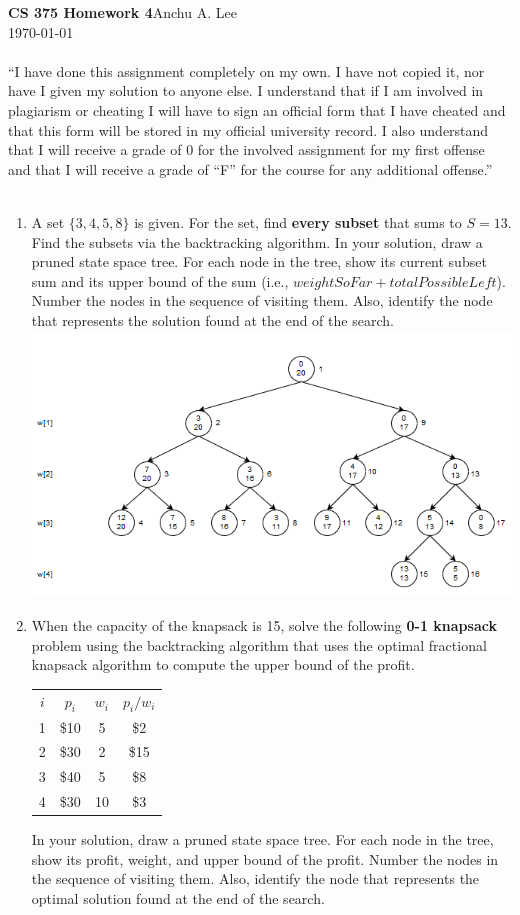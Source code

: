 \documentclass{article}
\begin{document}
\noindent\textbf{CS 375 Homework 4}\hfill Anchu A. Lee\\
\noindent\today
\\\\“I have done this assignment completely on my own. I have not copied it, nor have I given my solution to anyone else. I understand that if I am involved in plagiarism or cheating I will have to sign an official form that I have cheated and that this form will be stored in my official university record. I also understand that I will receive a grade of 0 for the involved assignment for my first offense and that I will receive a grade of “F” for the course for any additional offense.” 
\\\\
\begin{enumerate}
    \item A set $\{3, 4, 5, 8\}$ is given. For the set, find \textbf{every 
    subset} that sums to $S = 13$. Find the subsets via the backtracking 
    algorithm. In your solution, draw a pruned state space tree. For each node 
    in the tree, show its current subset sum and its upper bound of the sum 
    (i.e., $weightSoFar + totalPossibleLeft$). Number the nodes in the 
    sequence of visiting them. Also, identify the node that represents the 
    solution found at the end of the search.\newline
    \includegraphics[scale=0.8]{p1_tree}
    \item When the capacity of the knapsack is 15, solve the following 
    \textbf{0-1 knapsack} problem using the backtracking algorithm that uses 
    the optimal fractional knapsack algorithm to compute the upper bound of 
    the profit.\newline
    \begin{tabular}{c c c c}
        $i$ & $p_i$ & $w_i$ & $p_i / w_i$\\
        1 & \$10 & 5 & \$2\\
        2 & \$30 & 2 & \$15\\
        3 & \$40 & 5 & \$8\\
        4 & \$30 & 10 & \$3
    \end{tabular}\newline
    In your solution, draw a pruned state space tree. For each node in the 
    tree, show its profit, weight, and upper bound of the profit. Number the 
    nodes in the sequence of visiting them. Also, identify the node that 
    represents the optimal solution found at the end of the search.


\end{enumerate}
\end{document}
